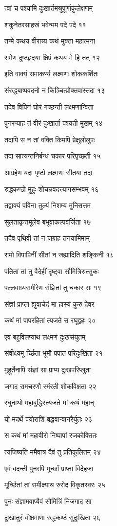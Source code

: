 त्वां च पश्यामि दुःखार्तमश्रुपूर्णाकुलेक्षणम्

शकुनेतरसाहस्रं भवेन्मम पदे पदे ११

तन्मे कथय वीराग्र्य कथं मुक्ता महात्मना

रामेण दुष्टहृदया क्षिप्रं कथय मे हि तत् १२

इति वाक्यं समाकर्ण्य लक्ष्मणः शोककर्शितः

संरुद्धबाष्पवदनो न किञ्चित्प्रोक्तवांस्तदा १३

तदेव विपिनं घोरं गच्छन्ती लक्ष्मणान्विता

पुनरप्याह तं वीरं दुःखार्ता पश्यती मुखम् १४

तदापि स न तां वक्ति किमपि प्रेक्षुलोलुपः

तदा सात्यन्तनिर्बन्धं चकार परिपृच्छती १५

आग्रहेण यदा पृष्टो लक्ष्मणः सीतया तदा

रुद्धकण्ठो मुहुः शोचन्नवदत्त्यागसम्भवम् १६

तद्वाक्यं पविना तुल्यं निशम्य मुनिसत्तम

सुलताकृत्तमूलेव बभूवाकल्पवर्जिता १७

तदैव पृथिवी तां न जग्राह तनयामिमाम्

रामो विपापिनीं सीतां न जह्यादिति शङ्किनी १८

पतितां तां तु वैदेहीं दृष्ट्वा सौमित्रिरुत्सुकः

पल्लवाग्र्यसमीरेण संज्ञितां तु चकार सः १९

संज्ञां प्राप्ता ह्युवाचेदं मा हास्यं कुरु देवर

कथं मां पापरहितां त्यजते स रघूद्वहः २०

एवं बहुविलप्याथ लक्ष्मणं दुःखसंयुतम्

संवीक्ष्यमू र्च्छिता भूमौ पपात परिदुःखिता २१

मुहूर्तेनापि संज्ञां सा प्राप्य दुःखपरिप्लुता

जगाद रामचरणौ स्मंरती शोकविक्षता २२

रघुनाथो महाबुद्धिस्त्यजते मां कथं महान्

यो मदर्थे पयोराशिं बद्धवान्वानरैर्युतः २३

स कथं मां महावीरो निष्पापां रजकोक्तितः

त्यजिष्यति ममैवात्र दैवं तु प्रतिकूलितम् २४

एवं वदन्ती पुनरपि मूर्च्छां प्राप्ता विदेहजा

मूर्च्छितां तां समीक्ष्याथ रुरोद विकृतस्वरः २५

पुनः संज्ञामवाप्यैवं सौमित्रिं निजगाद सा

दुःखातुरं वीक्षमाणा रुद्धकण्ठं सुदुःखिता २६

